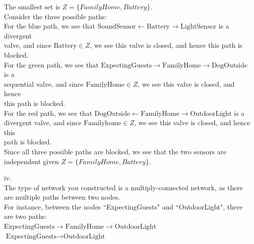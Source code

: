 \documentclass[11pt, oneside]{article}   	%
\begin{document}
\noindent The smallest set is $Z = \{FamilyHome, Battery\}$.\\

\noindent Consider the three possible paths:\\

\noindent\phantom{aaaa}For the blue path, we see that $\textrm{SoundSensor} \leftarrow \textrm{Battery} \rightarrow \textrm{LightSensor}$ is a divergent\\\phantom{aaaa}valve, and since $\textrm{Battery} \in Z$, we see this valve is closed, and hence this path is blocked.\\

\noindent\phantom{aaaa}For the green path, we see that $\textrm{ExpectingGuests} \rightarrow \textrm{FamilyHome} \rightarrow \textrm{DogOutside}$ is a \\\phantom{aaaa}sequential valve, and since $\textrm{FamilyHome} \in Z$, we see this valve is closed, and hence \\\phantom{aaaa}this path is blocked.\\

\noindent\phantom{aaaa}For the red path, we see that $\textrm{DogOutside} \leftarrow \textrm{FamilyHome} \rightarrow \textrm{OutdoorLight}$ is a \\\phantom{aaaa}divergent valve, and since $\textrm{Familyhome} \in Z$, we see this valve is closed, and hence this \\\phantom{aaaa}path is blocked.\\

\noindent Since all three possible paths are blocked, we see that the two sensors are independent given $Z = \{FamilyHome, Battery\}$.

\pagebreak 
\noindent{}iv. \\

\noindent{}The type of network you constructed is a multiply-connected network, as there are multiple paths between two nodes.\\

\noindent{}For instance, between the nodes ``ExpectingGuests" and ``OutdoorLight", there are two paths:\\
\noindent{}\phantom{aaaa}$\textrm{ExpectingGuests} \rightarrow \textrm{FamilyHome} \rightarrow \textrm{OutdoorLight}$\\
\noindent{}\phantom{aaaa}$\textrm{ExpectingGuests} \rightarrow \textrm{OutdoorLight}$\\
\end{document}
